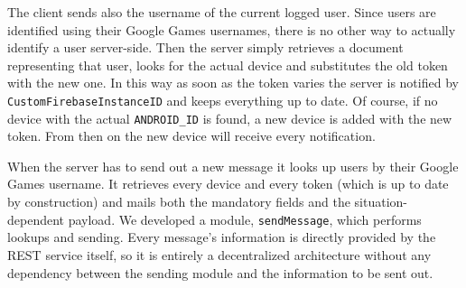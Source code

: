 The client sends also the username of the current logged user.
Since users are identified using their Google Games usernames, there is no
other way to actually identify a user server-side.
Then the server simply retrieves a document representing that user, looks for
the actual device and substitutes the old token with the new one.
In this way as soon as the token varies the server is notified by
\texttt{CustomFirebaseInstanceID} and keeps everything up to date.
Of course, if no device with the actual \texttt{ANDROID\_ID} is found, a new
device is added with the new token.
From then on the new device will receive every notification.

When the server has to send out a new message it looks up users by their
Google Games username.
It retrieves every device and every token (which is up to date by construction)
and mails both the mandatory fields and the situation-dependent payload.
We developed a module, \texttt{sendMessage}, which performs lookups and sending.
Every message's information is directly provided by the REST service itself,
so it is entirely a decentralized architecture without any dependency between
the sending module and the information to be sent out.
